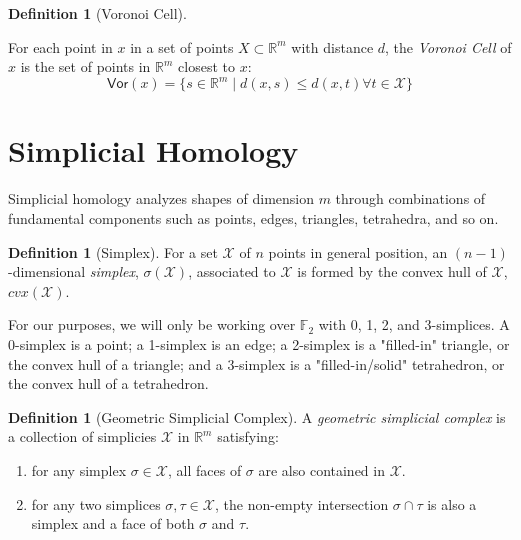 \documentclass[ma]{uncgdissertationexp}
\theoremstyle{plain}
\theoremstyle{definition}
\newtheorem{definition}[theorem]{Definition}
\theoremstyle{remark}
\begin{document}
\begin{definition}[Voronoi Cell]
\label{def:voronoi}
\par For each point in $x$ in a set of points $X\subset\mathbb{R}^{m}$ with distance $d$, the \textit{Voronoi Cell} of $x$ is the set of points in $\mathbb{R}^{m}$  closest to $x$:
$$\mathsf{Vor}(x) = \{s\in \mathbb{R}^{m} \mid d(x,s) \leq d(x, t) \forall t \in \mathcal{X}\}$$
\end{definition}

\section{Simplicial Homology}

\par Simplicial homology analyzes shapes of dimension $m$ through combinations of fundamental components such as points, edges, triangles, tetrahedra, and so on.

\begin{definition}[Simplex]
\par For a set $\mathcal{X}$ of $n$ points in general position, an $(n-1)$-dimensional \textit{simplex}, $\sigma(\mathcal{X})$, associated to $\mathcal{X}$ is formed by the convex hull of $\mathcal{X}$, $cvx(\mathcal{X})$.
\end{definition}

\par For our purposes, we will only be working over $\mathbb{F}_2$ with 0, 1, 2, and 3-simplices. A 0-simplex is a point; a 1-simplex is an edge; a 2-simplex is a "filled-in" triangle, or the convex hull of a triangle; and a 3-simplex is a "filled-in/solid" tetrahedron, or the convex hull of a tetrahedron.

\begin{definition}[Geometric Simplicial Complex]
\par A \textit{geometric simplicial complex} is a collection of simplicies $\mathcal{X}$ in $\mathbb{R}^m$ satisfying:
\begin{enumerate}
\item for any simplex $\sigma \in \mathcal{X}$, all faces of $\sigma$ are also contained in $\mathcal{X}$.
\item for any two simplices $\sigma, \tau \in \mathcal{X}$, the non-empty intersection $\sigma \cap \tau$ is also a simplex and a face of both $\sigma$ and $\tau$. 
\end{enumerate}
\end{definition}
\end{document}
